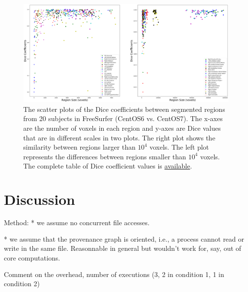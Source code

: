 \documentclass[a4paper,num-refs]{oup-contemporary}
\begin{document}
\begin{figure}
  \centering
    \includegraphics[width=\textwidth]{images/scatter_plot.png} 
    \caption{The scatter plots of the Dice coefficients between segmented regions 
            from 20 subjects in FreeSurfer (CentOS6 vs. CentOS7). 
            The x-axes are the number of voxels in each region and 
            y-axes are Dice values that are in different scales in two plots.
            The right plot shows the similarity between regions larger than $10^4$ voxels. 
            The left plot represents the differences between 
            regions smaller than $10^4$ voxels.
            The complete table of Dice coefficient values is 
            \href{https://github.com/ali4006/HCP-reproducibility-paper/blob/master/data/dice_values.csv}
            {available}.} 
    \label{fig:scatter_plot}
  \end{figure}

  

\section{Discussion}

Method:
* we assume no concurrent file accesses.

* we assume that the provenance graph is oriented, i.e., a process cannot read or write in the same file. Reasonnable in general but wouldn't work 
for, say, out of core computations.

Comment on the overhead, number of executions (3, 2 in condition 1, 1 in condition 2)
\end{document}
